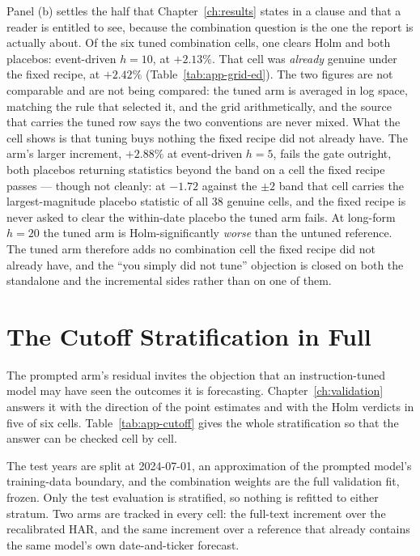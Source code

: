 Panel (b) settles the half that Chapter~\ref{ch:results} states in a clause
and that a reader is entitled to see, because the combination question is
the one the report is actually about. Of the six tuned combination cells,
one clears Holm and both placebos: event-driven $h{=}10$, at $+2.13\%$.
That cell was \emph{already} genuine under the fixed recipe, at $+2.42\%$
(Table~\ref{tab:app-grid-ed}). The two figures are not comparable and are not
being compared: the tuned arm is averaged in log space, matching the rule that
selected it, and the grid arithmetically, and the source that carries the tuned
row says the two conventions are never mixed. What the cell shows is that
tuning buys nothing the fixed recipe did not already have. %
The arm's larger increment, $+2.88\%$ at event-driven $h{=}5$,
fails the gate outright, both placebos returning statistics beyond the
band on a cell the fixed recipe passes --- though not cleanly: at $-1.72$
against the $\pm2$ band that cell carries the largest-magnitude placebo
statistic of all 38 genuine cells, and the fixed recipe is never asked to
clear the within-date placebo the tuned arm fails. %
At long-form $h{=}20$ the
tuned arm is Holm-significantly \emph{worse} than the untuned reference.
The tuned arm therefore adds no combination cell the fixed recipe did not
already have, and the ``you simply did not tune'' objection is closed on
both the standalone and the incremental sides rather than on one of them.

\FloatBarrier
\section{The Cutoff Stratification in Full}
\label{app:res-cutoff}

The prompted arm's residual invites the objection that an instruction-tuned
model may have seen the outcomes it is forecasting. Chapter~\ref{ch:validation}
answers it with the direction of the point estimates and with the Holm verdicts
in five of six cells. Table~\ref{tab:app-cutoff} gives
the whole stratification so that the answer can be checked cell by cell.

The test years are split at 2024-07-01, an approximation of the prompted
model's training-data boundary, and the combination weights are the full
validation fit, frozen. Only the test evaluation is stratified, so
nothing is refitted to either stratum. Two arms are tracked in every cell:
the full-text increment over the recalibrated HAR, and the same increment
over a reference that already contains the same model's own date-and-ticker
forecast.

